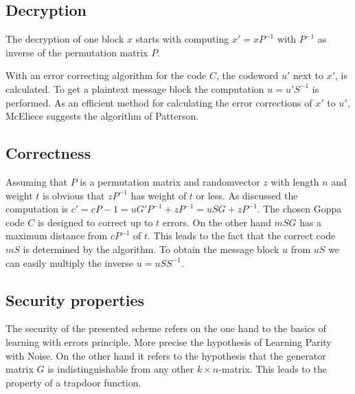 \subsection*{Decryption}
The decryption of one block $x$ starts with computing $x' = xP^{-1}$ with $P^{-1}$ as inverse of the permutation matrix $P$. 

With an error correcting algorithm for the code $C$, the codeword $u'$ next to $x'$, is calculated. 
To get a plaintext message block the computation $u = u'S^{-1}$ is performed\cite{wiki:mcelice}\cite{mceliece1978public}.
As an efficient method for calculating the error corrections of $x'$ to $u'$, McEliece suggests the algorithm of Patterson\cite{patterson1975algebraic}. 


\subsection*{Correctness}
Assuming that $P$ is a permutation matrix and randomvector $z$ with length $n$ and weight $t$ is obvious that $zP^{-1}$ has weight of $t$ or less.
As discussed the computation is $c' = c P - 1 = uG'P^{-1} + zP^{-1} = uSG + z P^{-1}$.
The chosen Goppa code $C$ is designed to correct up to $t$ errors. On the other hand $mSG$ has a maximum distance from $cP^{-1}$ of $t$. This leads to the fact that the correct code $mS$ is determined by the algorithm. 
To obtain the message block $u$ from $uS$ we can easily multiply the inverse $u = uSS^{-1}$\cite{wiki:mcelice}.

\subsection*{Security properties}
The security of the presented scheme refers on the one hand to the basics of learning with errors principle. More precise the hypothesis of Learning Parity with Noise\cite{pietrzak2012cryptography}. 
On the other hand it refers to the hypothesis that the generator matrix $G$ is indistinguishable from any other $k \times n$-matrix. This leads to the property of a trapdoor function.

